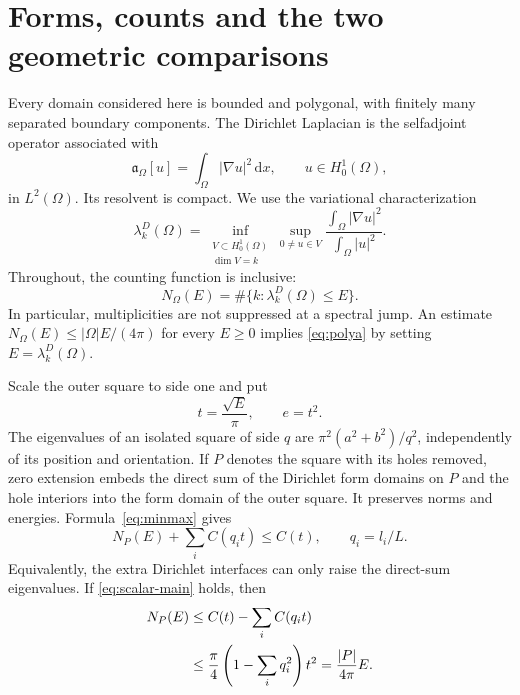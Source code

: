 \documentclass[11pt,reqno]{amsart}
\numberwithin{equation}{section}
\newcommand{\dd}{\,\mathrm d}
\newcommand{\abs}[1]{\lvert#1\rvert}
\newcommand{\Om}{\Omega}
\begin{document}
\section{Forms, counts and the two geometric comparisons}\label{sec:comparison}

Every domain considered here is bounded and polygonal, with finitely
many separated boundary components. The Dirichlet Laplacian is the
selfadjoint operator associated with
\[
 \mathfrak a_\Om[u]=\int_\Om\abs{\nabla u}^2\dd x,
 \qquad u\in H^1_0(\Om),
\]
in $L^2(\Om)$. Its resolvent is compact. We use the variational
characterization
\begin{equation}\label{eq:minmax}
 \lambda_k^D(\Om)=
 \inf_{\substack{V\subset H^1_0(\Om)\\\dim V=k}}
 \sup_{0\ne u\in V}
 \frac{\int_\Om\abs{\nabla u}^2}{\int_\Om\abs u^2}.
\end{equation}
Throughout, the counting function is inclusive:
\begin{equation}\label{eq:inclusive}
 N_\Om(E)=\#\{k:\lambda_k^D(\Om)\le E\}.
\end{equation}
In particular, multiplicities are not suppressed at a spectral jump.
An estimate $N_\Om(E)\le\abs\Om E/(4\pi)$ for every $E\ge0$
implies \eqref{eq:polya} by setting $E=\lambda_k^D(\Om)$.

Scale the outer square to side one and put
\begin{equation}\label{eq:energy-normalization}
 t=\frac{\sqrt E}{\pi},\qquad e=t^2.
\end{equation}
The eigenvalues of an isolated square of side $q$ are
$\pi^2(a^2+b^2)/q^2$, independently of its position and orientation.
If $P$ denotes the square with its holes removed, zero extension
embeds the direct sum of the Dirichlet form domains on $P$ and
the hole interiors into the form domain of the outer square.
It preserves norms and energies. Formula~\eqref{eq:minmax} gives
\begin{equation}\label{eq:subtraction}
 N_P(E)+\sum_i C(q_it)\le C(t),
 \qquad q_i=l_i/L.
\end{equation}
Equivalently, the extra Dirichlet interfaces can only raise the
direct-sum eigenvalues. If \eqref{eq:scalar-main} holds, then
\begin{align}
 N_P(E)&\le C(t)-\sum_i C(q_it)\notag\\
 &\le\frac\pi4\left(1-\sum_iq_i^2\right)t^2
 =\frac{\abs P}{4\pi}E.\label{eq:subtraction-weyl}
\end{align}
\end{document}
